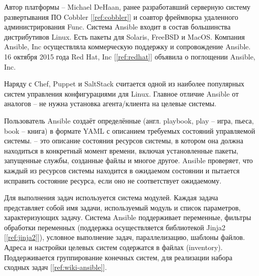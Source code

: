 Автор платформы -- Michael DeHaan, ранее разработавший серверную систему
развертывания ПО Cobbler [\ref{ref:cobbler}] и соавтор фреймворка удаленного
администрирования Func. Система Ansible входит в состав большинства
дистрибутивов Linux. Есть пакеты для Solaris, FreeBSD и MacOS. Компания Ansible,
Inc осуществляла коммерческую поддержку и сопровождение Ansible. 16 октября 2015
года Red Hat, Inc [\ref{ref:redhat}] объявила о поглощении Ansible, Inc.

Наряду с Chef, Puppet и SaltStack считается одной из наиболее популярных систем
управления конфигурациями для Linux. Главное отличие Ansible от аналогов -- не
нужна установка агента/клиента на целевые системы.

Пользователь Ansible создаёт определённые  (англ. playbook,
play -- игра, пьеса, book -- книга) в формате YAML с описанием требуемых
состояний управляемой системы.  -- это описание состояния
ресурсов системы, в котором она должна находиться в конкретный момент времени,
включая установленные пакеты, запущенные службы, созданные файлы и многое
другое. Ansible проверяет, что каждый из ресурсов системы находится в ожидаемом
состоянии и пытается исправить состояние ресурса, если оно не соответствует
ожидаемому.

Для выполнения задач используется система модулей. Каждая задача представляет
собой имя задачи, используемый модуль и список параметров, характеризующих
задачу. Система Ansible поддерживает переменные, фильтры обработки переменных
(поддержка осуществляется библиотекой Jinja2 [\ref{ref:jinja2}]), условное
выполнение задач, параллелизацию, шаблоны файлов. Адреса и настройки целевых
систем содержатся в файлах  (inventory). Поддерживается
группирование конечных систем, для реализации набора сходных задач
[\ref{ref:wiki-ansible}].
